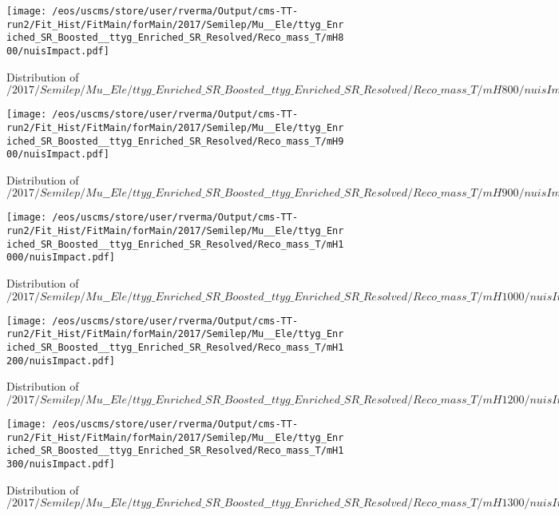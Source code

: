 \begin{figure}
\centering
\texttt{[image: /eos/uscms/store/user/rverma/Output/cms-TT-run2/Fit\_Hist/FitMain/forMain/2017/Semilep/Mu\_\_Ele/ttyg\_Enriched\_SR\_Boosted\_\_ttyg\_Enriched\_SR\_Resolved/Reco\_mass\_T/mH800/nuisImpact.pdf]}
\caption{Distribution of $/2017/Semilep/Mu\_\_Ele/ttyg\_Enriched\_SR\_Boosted\_\_ttyg\_Enriched\_SR\_Resolved/Reco\_mass\_T/mH800/nuisImpact.pdf$}
\end{figure}

\begin{figure}
\centering
\texttt{[image: /eos/uscms/store/user/rverma/Output/cms-TT-run2/Fit\_Hist/FitMain/forMain/2017/Semilep/Mu\_\_Ele/ttyg\_Enriched\_SR\_Boosted\_\_ttyg\_Enriched\_SR\_Resolved/Reco\_mass\_T/mH900/nuisImpact.pdf]}
\caption{Distribution of $/2017/Semilep/Mu\_\_Ele/ttyg\_Enriched\_SR\_Boosted\_\_ttyg\_Enriched\_SR\_Resolved/Reco\_mass\_T/mH900/nuisImpact.pdf$}
\end{figure}

\begin{figure}
\centering
\texttt{[image: /eos/uscms/store/user/rverma/Output/cms-TT-run2/Fit\_Hist/FitMain/forMain/2017/Semilep/Mu\_\_Ele/ttyg\_Enriched\_SR\_Boosted\_\_ttyg\_Enriched\_SR\_Resolved/Reco\_mass\_T/mH1000/nuisImpact.pdf]}
\caption{Distribution of $/2017/Semilep/Mu\_\_Ele/ttyg\_Enriched\_SR\_Boosted\_\_ttyg\_Enriched\_SR\_Resolved/Reco\_mass\_T/mH1000/nuisImpact.pdf$}
\end{figure}

\begin{figure}
\centering
\texttt{[image: /eos/uscms/store/user/rverma/Output/cms-TT-run2/Fit\_Hist/FitMain/forMain/2017/Semilep/Mu\_\_Ele/ttyg\_Enriched\_SR\_Boosted\_\_ttyg\_Enriched\_SR\_Resolved/Reco\_mass\_T/mH1200/nuisImpact.pdf]}
\caption{Distribution of $/2017/Semilep/Mu\_\_Ele/ttyg\_Enriched\_SR\_Boosted\_\_ttyg\_Enriched\_SR\_Resolved/Reco\_mass\_T/mH1200/nuisImpact.pdf$}
\end{figure}

\begin{figure}
\centering
\texttt{[image: /eos/uscms/store/user/rverma/Output/cms-TT-run2/Fit\_Hist/FitMain/forMain/2017/Semilep/Mu\_\_Ele/ttyg\_Enriched\_SR\_Boosted\_\_ttyg\_Enriched\_SR\_Resolved/Reco\_mass\_T/mH1300/nuisImpact.pdf]}
\caption{Distribution of $/2017/Semilep/Mu\_\_Ele/ttyg\_Enriched\_SR\_Boosted\_\_ttyg\_Enriched\_SR\_Resolved/Reco\_mass\_T/mH1300/nuisImpact.pdf$}
\end{figure}

